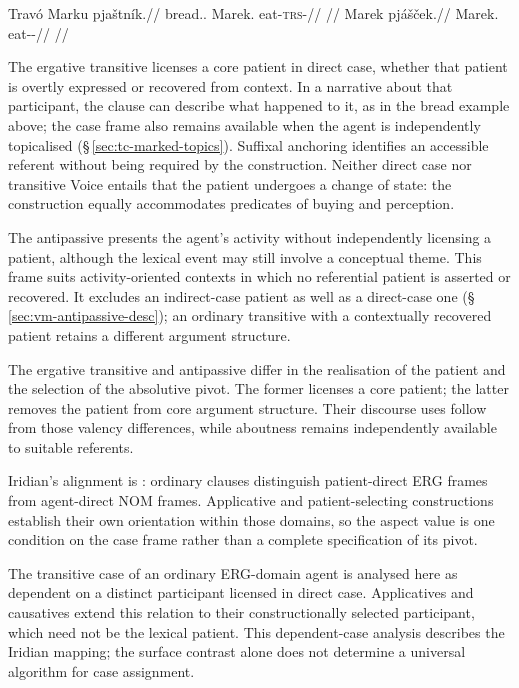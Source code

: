 \pex
\a
\begingl
\gla Travó Marku pjaštník.//
\glb bread.\Dir{}.\Def{} Marek.\Trs{} eat-\textsc{trs}-\Pf{}//
\glft {} //
\endgl
\a
\begingl
\gla Marek pjášček.//
\glb Marek.\Dir{} eat-\Antip{}-\Pf{}//
\glft {} //
\endgl
\xe

The ergative transitive licenses a core patient in direct case, whether that
patient is overtly expressed or recovered from context. In a narrative about
that participant, the clause can describe what happened to it, as in the
bread example above; the case frame also remains available when the agent is
independently topicalised (§\,\ref{sec:tc-marked-topics}). Suffixal anchoring
identifies an accessible referent without being required by the construction.
Neither direct case nor transitive Voice entails that the patient undergoes
a change of state: the construction equally accommodates predicates of buying
and perception.

The antipassive presents the agent's activity without independently licensing
a patient, although the lexical event may still involve a conceptual theme.
This frame suits activity-oriented contexts in which no referential patient is
asserted or recovered. It excludes an indirect-case patient as well as a
direct-case one (§\,\ref{sec:vm-antipassive-desc}); an ordinary transitive
with a contextually recovered patient retains a different argument structure.

The ergative transitive and antipassive differ in the realisation of the
 patient and the selection of the absolutive pivot. The former licenses a
 core patient; the latter removes the patient from core argument structure.
 Their discourse uses follow from those valency differences, while aboutness
 remains independently available to suitable referents.

Iridian's alignment is : ordinary clauses distinguish
patient-direct ERG frames from agent-direct NOM frames. Applicative and
patient-selecting constructions establish their own orientation within those
domains, so the aspect value is one condition on the case frame rather than a
complete specification of its pivot.

The transitive case of an ordinary ERG-domain agent is analysed here as
dependent on a distinct participant licensed in direct case. Applicatives and
causatives extend this relation to their constructionally selected participant,
which need not be the lexical patient. This dependent-case analysis describes
the Iridian mapping; the surface contrast alone does not determine a universal
algorithm for case assignment.

